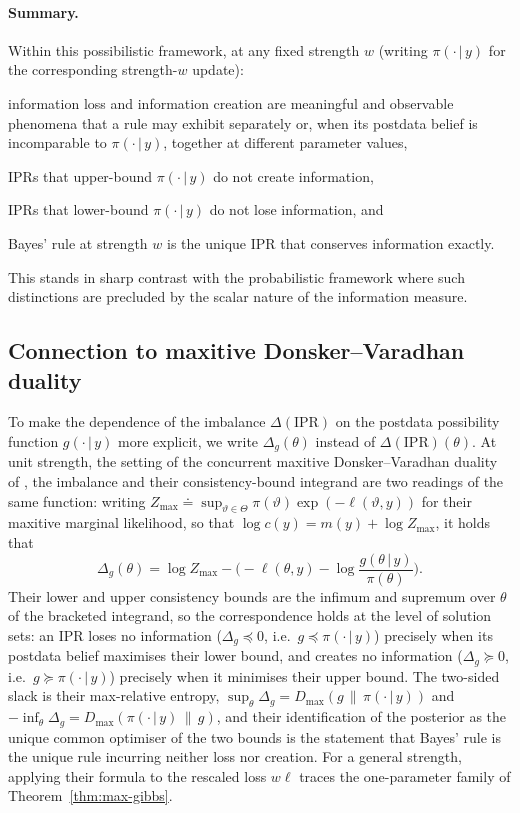 \documentclass[accepted]{uai2026} %
\def\given{\,|\,}
\theoremstyle{remark}
\begin{document}
\paragraph{Summary.} Within this possibilistic framework, at any fixed strength
$w$ (writing $\pi(\cdot\given y)$ for the corresponding strength-$w$ update):
\begin{enumerate*}[label=\roman*)]
  \item information loss and information creation are meaningful and observable phenomena that a rule may exhibit separately or, when its postdata belief is incomparable to $\pi(\cdot\given y)$, together at different parameter values,
  \item IPRs that upper-bound $\pi(\cdot\given y)$ do not create information,
  \item IPRs that lower-bound $\pi(\cdot\given y)$ do not lose information, and
  \item Bayes' rule at strength $w$ is the unique IPR that conserves information exactly.
\end{enumerate*}

This stands in sharp contrast with the probabilistic framework where such distinctions are precluded by the scalar nature of the information measure.


\subsection{Connection to maxitive Donsker--Varadhan duality}
\label{sec:dual-guarantees}

To make the dependence of the imbalance $\Delta(\mathrm{IPR})$ on the postdata possibility function $g(\cdot \given y)$ more explicit, we write $\Delta_g(\theta)$ instead of $\Delta(\mathrm{IPR})(\theta)$. At unit strength, the setting of the concurrent maxitive Donsker--Varadhan duality of \citet{singh2025maxitive}, the imbalance and their consistency-bound integrand are two readings of the same function: writing $Z_{\max} \doteq \sup_{\vartheta\in\Theta} \pi(\vartheta) \exp(-\ell(\vartheta,y))$ for their maxitive marginal likelihood, so that $\log c(y) = m(y) + \log Z_{\max}$, it holds that
\[
\Delta_g(\theta) = \log Z_{\max} - \Big( -\ell(\theta,y) - \log\frac{g(\theta \given y)}{\pi(\theta)} \Big).
\]
Their lower and upper consistency bounds are the infimum and supremum over $\theta$ of the bracketed integrand, so the correspondence holds at the level of solution sets: an IPR loses no
information ($\Delta_g \preceq 0$, i.e.\ $g \preceq \pi(\cdot\given y)$) precisely when its postdata belief maximises their lower bound, and creates no information ($\Delta_g \succeq 0$, i.e.\ $g \succeq \pi(\cdot\given y)$) precisely when it minimises their upper bound. The two-sided slack is their max-relative entropy, $\sup_{\theta} \Delta_g = D_{\max}(g \,\|\,
\pi(\cdot\given y))$ and $-\inf_{\theta} \Delta_g = D_{\max}(\pi(\cdot\given y) \,\|\, g)$, and their identification of the posterior as the unique common optimiser of the two bounds is the statement that Bayes' rule is the unique rule incurring neither loss nor creation. For a general strength, applying their formula to the rescaled loss $w\ell$ traces the one-parameter family of Theorem~\ref{thm:max-gibbs}.
\end{document}
